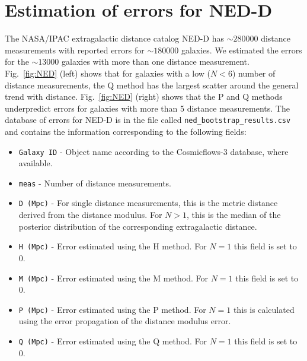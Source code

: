 \documentclass[a4paper,fleqn,usenatbib]{mnras}
\begin{document}
\section{Estimation of errors for NED-D}
The NASA/IPAC extragalactic distance catalog NED-D has $\sim280000$ distance measurements with reported errors for $\sim180000$ galaxies. We estimated the errors for the $\sim13000$ galaxies with more than one distance measurement. Fig.~\ref{fig:NED} (left) shows that for galaxies with a low ($N<6$) number of distance measurements, the Q method has the largest scatter around the general trend with distance. Fig.~\ref{fig:NED} (right) shows that the P and Q methods underpredict errors for galaxies with more than 5 distance measurements. The database of errors for NED-D is in the file called \texttt{ned\_bootstrap\_results.csv} and contains the information corresponding to the following fields:
\begin{itemize}
\item \texttt{Galaxy ID} - Object name according to the Cosmicflows-3 database, where available.
\item \texttt{meas} - Number of distance measurements.
\item \texttt{D (Mpc)} - For single distance measurements, this is the metric distance derived from the distance modulus. For $N>1$, this is the median of the posterior distribution of the corresponding extragalactic distance.
\item \texttt{H (Mpc)} - Error estimated using the H method. For $N=1$ this field is set to 0.
\item \texttt{M (Mpc)} - Error estimated using the M method. For $N=1$ this field is set to 0.
\item \texttt{P (Mpc)} - Error estimated using the P method. For $N=1$ this is calculated using the error propagation of the distance modulus error.
\item \texttt{Q (Mpc)} - Error estimated using the Q method. For $N=1$ this field is set to 0.
\end{itemize}








\bsp	%
\label{lastpage}
\end{document}
